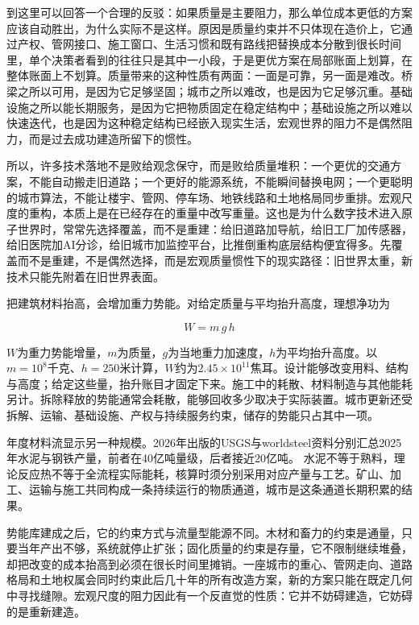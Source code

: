到这里可以回答一个合理的反驳：如果质量是主要阻力，那么单位成本更低的方案应该自动胜出，为什么实际不是这样。原因是质量约束并不只体现在造价上，它通过产权、管网接口、施工窗口、生活习惯和既有路线把替换成本分散到很长时间里，单个决策者看到的往往只是其中一小段，于是更优方案在局部账面上划算，在整体账面上不划算。质量带来的这种性质有两面：一面是可靠，另一面是难改。桥梁之所以可用，是因为它足够坚固；城市之所以难改，也是因为它足够沉重。基础设施之所以能长期服务，是因为它把物质固定在稳定结构中；基础设施之所以难以快速迭代，也是因为这种稳定结构已经嵌入现实生活，宏观世界的阻力不是偶然阻力，而是过去成功建造所留下的惯性。

所以，许多技术落地不是败给观念保守，而是败给质量堆积：一个更优的交通方案，不能自动搬走旧道路；一个更好的能源系统，不能瞬间替换电网；一个更聪明的城市算法，不能让楼宇、管网、停车场、地铁线路和土地格局同步重排。宏观尺度的重构，本质上是在已经存在的重量中改写重量。这也是为什么数字技术进入原子世界时，常常先选择覆盖，而不是重建：给旧道路加导航，给旧工厂加传感器，给旧医院加AI分诊，给旧城市加监控平台，比推倒重构底层结构便宜得多。先覆盖而不是重建，不是偶然选择，而是宏观质量惯性下的现实路径：旧世界太重，新技术只能先附着在旧世界表面。


把建筑材料抬高，会增加重力势能。对给定质量与平均抬升高度，理想净功为

\begin{equation}
W=m\,g\,h
\end{equation}

$W$为重力势能增量，$m$为质量，$g$为当地重力加速度，$h$为平均抬升高度。以$m=10^8$千克、$h=250$米计算，$W$约为$2.45\times10^{11}$焦耳。设计能够改变用料、结构与高度；给定这些量，抬升账目才固定下来。施工中的耗散、材料制造与其他能耗另计。拆除释放的势能通常会耗散，能够回收多少取决于实际装置。城市更新还受拆解、运输、基础设施、产权与持续服务约束，储存的势能只占其中一项。

年度材料流显示另一种规模。2026年出版的USGS与worldsteel资料分别汇总2025年水泥与钢铁产量，前者在40亿吨量级，后者接近20亿吨。\cite{usgs2026cement,worldsteel2026figures} 水泥不等于熟料，理论反应热不等于全流程实际能耗，核算时须分别采用对应产量与工艺。矿山、加工、运输与施工共同构成一条持续运行的物质通道，城市是这条通道长期积累的结果。

势能库建成之后，它的约束方式与流量型能源不同。木材和畜力的约束是通量，只要当年产出不够，系统就停止扩张；固化质量的约束是存量，它不限制继续堆叠，却把改变的成本抬高到必须在很长时间里摊销。一座城市的重心、管网走向、道路格局和土地权属会同时约束此后几十年的所有改造方案，新的方案只能在既定几何中寻找缝隙。宏观尺度的阻力因此有一个反直觉的性质：它并不妨碍建造，它妨碍的是重新建造。


